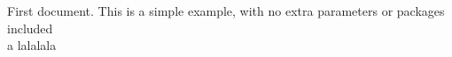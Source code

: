 \documentclass{article}
\begin{document}
First document. This is a simple example, with no
extra parameters or packages included
\\a
lalalala
\end{document}
